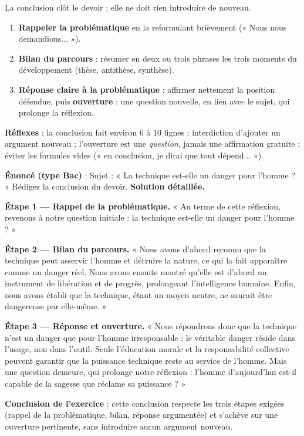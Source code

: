 \documentclass[11pt]{article}
\newcommand{\cle}[1]{{\popxbold\color{popdark}#1}}
\begin{document}
\begin{methode}
La \cle{conclusion} clôt le devoir ; elle ne doit rien introduire de nouveau.
\begin{enumerate}
\item \textbf{Rappeler la problématique} en la reformulant brièvement (« Nous nous demandions... »).
\item \textbf{Bilan du parcours} : résumer en deux ou trois phrases les trois moments du développement (thèse, antithèse, synthèse).
\item \textbf{Réponse claire à la problématique} : affirmer nettement la position défendue, puis \textbf{ouverture} : une question nouvelle, en lien avec le sujet, qui prolonge la réflexion.
\end{enumerate}
\textbf{Réflexes} : la conclusion fait environ 6 à 10 lignes ; interdiction d'ajouter un argument nouveau ; l'ouverture est une \emph{question}, jamais une affirmation gratuite ; éviter les formules vides (« en conclusion, je dirai que tout dépend... »).
\end{methode}

\begin{exoresolu}
\textbf{Énoncé (type Bac)} : Sujet : « La technique est-elle un danger pour l'homme ? » Rédigez la conclusion du devoir.
\tcblower
\textbf{Solution détaillée.}

\textbf{Étape 1 — Rappel de la problématique.} « Au terme de cette réflexion, revenons à notre question initiale : la technique est-elle un danger pour l'homme ? »

\textbf{Étape 2 — Bilan du parcours.} « Nous avons d'abord reconnu que la technique peut asservir l'homme et détruire la nature, ce qui la fait apparaître comme un danger réel. Nous avons ensuite montré qu'elle est d'abord un instrument de libération et de progrès, prolongeant l'intelligence humaine. Enfin, nous avons établi que la technique, étant un moyen neutre, ne saurait être dangereuse par elle-même. »

\textbf{Étape 3 — Réponse et ouverture.} « Nous répondrons donc que la technique n'est un danger que pour l'homme irresponsable : le véritable danger réside dans l'usage, non dans l'outil. Seule l'éducation morale et la responsabilité collective peuvent garantir que la puissance technique reste au service de l'homme. Mais une question demeure, qui prolonge notre réflexion : l'homme d'aujourd'hui est-il capable de la sagesse que réclame sa puissance ? »

\textbf{Conclusion de l'exercice} : cette conclusion respecte les trois étapes exigées (rappel de la problématique, bilan, réponse argumentée) et s'achève sur une ouverture pertinente, sans introduire aucun argument nouveau.
\end{exoresolu}
\end{document}

